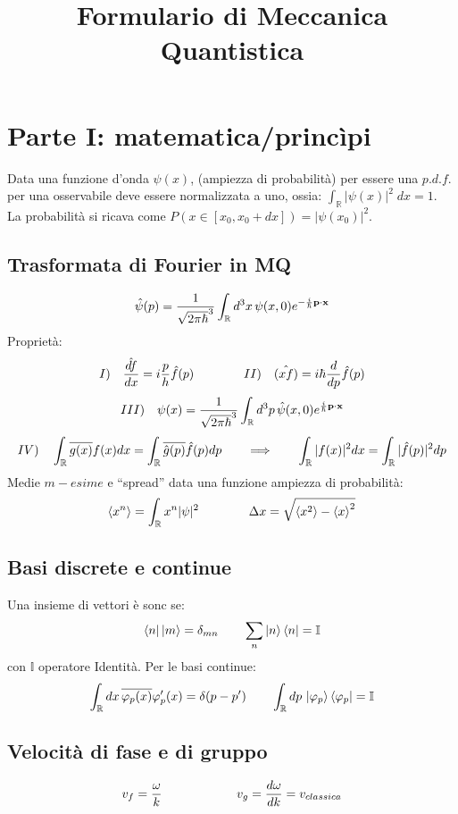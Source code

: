 

\title{Formulario di Meccanica Quantistica}
\author{}



\maketitle


\section{Parte I: matematica/princìpi}
Data una funzione d'onda $\psi(x)$, (ampiezza di probabilità) per essere una $p.d.f.$ per una osservabile deve essere normalizzata a uno,
ossia: $ \int_\mathbb{R} | \psi(x) |^2\; dx = 1 $. \\
La probabilità si ricava come $ P(x\in\left[x_0,x_0 + dx\right])= | \psi(x_0) |^2 $. \\
\subsection{Trasformata di Fourier in MQ}
$$
\hat{\psi}(p)= \frac{1}{\sqrt{2 \pi \hbar}^3} \int_\mathbb{R} d^3 x \, \psi(x,0) e^{-\frac{i}{\hbar} \mathbf{p}\cdot {\ensuremath{\mathbf{x}}}}$$ 
Proprietà:
$$
 I) \quad \hat{\frac{d f}{d x}} = i \frac{p}{h} \hat{f}(p)  \qquad \qquad II) \quad \hat{(xf)} = i \hbar \frac{d }{d p}\hat{f}(p)
$$
$$
III) \quad \psi(x)= \frac{1}{\sqrt{2 \pi \hbar}^3} \int_\mathbb{R} d^3 p \, \hat{\psi}(x,0) e^{\frac{i}{\hbar} \mathbf{p}\cdot {\ensuremath{\mathbf{x}}}}$$ 
$$
    IV) \quad \int_\mathbb{R} \overline{g(x)} f(x) dx =  \int_\mathbb{R} \overline{\hat{g}(p)}  \hat{f}(p) dp \qquad \Longrightarrow \qquad \int_\mathbb{R} |f(x)|^2 dx = \int_\mathbb{R} |\hat{f}(p)|^2 dp
$$
Medie $m-esime$ e ``spread'' data una funzione ampiezza di probabilità:
$$ \left< x ^{n} \right> = \int_\mathbb{R} x^n | \psi|^2 \qquad \qquad \Delta x = \sqrt{ \left< x ^{2} \right> - \left< x \right>^2}
$$ 
\subsection{Basi discrete e continue}
Una insieme di vettori è sonc se:
$$ 
 \left< n \right|\left| m \right> = \delta_{mn} \qquad \sum_n \left| n \right>\left< n \right| = \mathbb{I}
$$
con $\mathbb{I} $ operatore Identità.
Per le basi continue:
$$
\int_\mathbb{R} dx \, \overline{\varphi_p (x)} \varphi_p' (x)  = \delta(p-p') \qquad 
\int_\mathbb{R} dp \, \left| \varphi_p \right> \left< \varphi_p \right|  = \mathbb{I} 
$$

\subsection{Velocità di fase e di gruppo}
$$
v_f = \frac{\omega}{k} \qquad \qquad \qquad v_g= \frac{d \omega}{d k} = v_{classica}
$$
